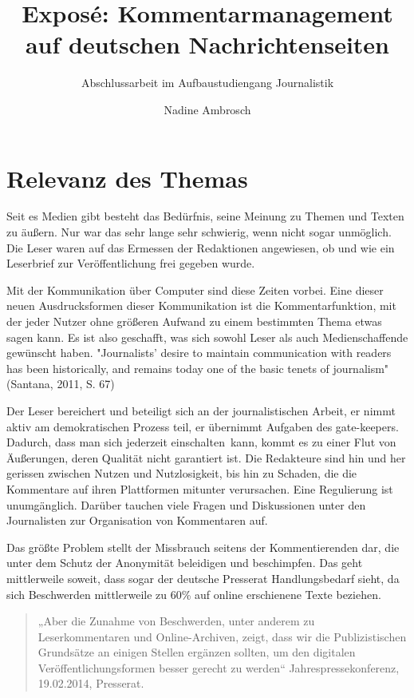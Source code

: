 \documentclass[12pt,titlepage=no]{scrartcl} %
\title{Exposé: Kommentarmanagement auf deutschen Nachrichtenseiten}
\subtitle{Abschlussarbeit im Aufbaustudiengang Journalistik}
\author{Nadine Ambrosch}
\begin{document}
\maketitle




\section{Relevanz des Themas}

Seit es Medien gibt besteht das Bedürfnis, seine Meinung zu Themen und Texten zu
äußern. Nur war das sehr lange sehr schwierig, wenn nicht sogar unmöglich. Die
Leser waren auf das Ermessen der Redaktionen angewiesen, ob und wie ein
Leserbrief zur Veröffentlichung frei gegeben wurde. 

Mit der Kommunikation über
Computer sind diese Zeiten vorbei. Eine dieser neuen Ausdrucksformen dieser
Kommunikation ist die Kommentarfunktion, mit der jeder Nutzer ohne größeren
Aufwand zu einem bestimmten Thema etwas sagen kann. Es ist also geschafft, was
sich sowohl Leser als auch Medienschaffende gewünscht haben. "Journalists’ desire to 
maintain communication with readers has
been historically, and remains today one of the basic tenets of journalism" (Santana, 2011, S. 67) 

Der Leser bereichert und beteiligt sich an der journalistischen Arbeit, er nimmt
aktiv am demokratischen Prozess teil, er übernimmt Aufgaben des gate-keepers.
Dadurch, dass man sich jederzeit \glqq einschalten\grqq\ kann, kommt es zu
einer Flut von Äußerungen, deren Qualität nicht garantiert ist. Die Redakteure
sind hin und her gerissen zwischen Nutzen und Nutzlosigkeit, bis hin zu Schaden,
die die Kommentare auf ihren Plattformen mitunter verursachen. Eine Regulierung
ist unumgänglich. Darüber tauchen viele Fragen und Diskussionen unter den
Journalisten zur Organisation von Kommentaren auf.

Das größte Problem stellt der Missbrauch seitens der Kommentierenden dar, die unter dem Schutz
der Anonymität beleidigen und beschimpfen. Das geht mittlerweile soweit, dass
sogar der deutsche Presserat Handlungsbedarf sieht, da sich Beschwerden
mittlerweile zu 60\% auf online erschienene Texte beziehen.  

\begin{quote}
„Aber die Zunahme
von Beschwerden, unter anderem zu Leserkommentaren und Online-Archiven, zeigt,
dass wir die Publizistischen Grundsätze an einigen Stellen ergänzen sollten, um
den digitalen Ver\-öffentlichungs\-for\-men besser gerecht zu werden“
Jahrespressekonferenz, 19.02.2014, Presserat. 
\end{quote}
\end{document}
